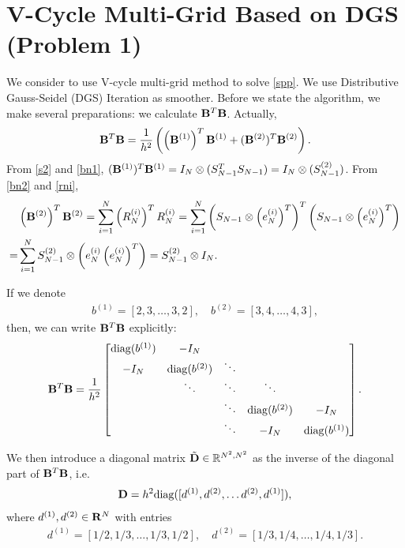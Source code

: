 \documentclass[english]{pkupaper}
\newenvironment{eqt}{\begin{equation}\begin{aligned}}{\end{aligned}\end{equation}}
\begin{document}
\section{V-Cycle Multi-Grid Based on DGS (Problem 1)}
\label{sec:prob1}
We consider to use V-cycle multi-grid method to solve \ref{spp}. We use Distributive Gauss-Seidel (DGS) Iteration as smoother. Before we state the algorithm, we make several preparations: we calculate $\mathbf{B}^T\mathbf{B}$. Actually,
\begin{eqt}
\mfB^T\mfB=\frac{1}{h^2}\left(\left(\mfB^{(1)}\right)^T\mfB^{(1)}+(\mfB^{(2)})^T\mfB^{(2)}\right).
\end{eqt}
From \ref{s2} and \ref{bn1}, $(\mathbf{B}^{(1)})^T\mathbf{B}^{(1)}=I_N\otimes (S_{N-1}^TS_{N-1})=I_N\otimes (S_{N-1}^{(2)})$. From \ref{bn2} and \ref{rni}, 
\begin{eqt}
&\left(\mfB^{(2)}\right)^T\mfB^{(2)}=\sum_{i=1}^N\left(R_N^{(i)}\right)^TR_N^{(i)}=\sum_{i=1}^N\left(S_{N-1}\otimes \left(e_N^{(i)}\right)^T\right)^T\left(S_{N-1}\otimes \left(e_N^{(i)}\right)^T\right)\\
=&\sum_{i=1}^NS_{N-1}^{(2)}\otimes\left(e_N^{(i)}\left(e_N^{(i)}\right)^T\right)=S_{N-1}^{(2)}\otimes I_N.
\end{eqt}

If we denote
\begin{eqt}
b^{(1)}=[2,3,\dots, 3,2],\quad b^{(2)}=[3,4,\dots, 4,3],
\end{eqt}
then, we can write $\mathbf{B}^T\mathbf{B}$ explicitly:
\begin{eqt}
\mfB^T\mfB=\frac{1}{h^2}\begin{bmatrix}
\mathrm{diag}(b^{(1)})&-I_N\\
-I_N&\mathrm{diag}(b^{(2)})&\ddots\\
&\ddots&\ddots&\ddots\\
&&\ddots&\mathrm{diag}(b^{(2)})&-I_N\\
&&\ddots&-I_N&\mathrm{diag}(b^{(1)})\\
\end{bmatrix}.
\end{eqt}

We then introduce a diagonal matrix $\tilde {\mathbf{D}}\in \mathbb{R}^{N^2, N^2}$ as the inverse of the diagonal part of $\mathbf{B}^T\mathbf{B}$, i.e.
\begin{eqt}
\label{mfD}
\mfD=h^2\mathrm{diag}([d^{(1)}, d^{(2)}, \dots d^{(2)}, d^{(1)}]),
\end{eqt}
where $d^{(1)}, d^{(2)}\in\mathbf{R}^N$ with entries 
\begin{eqt}
d^{(1)}=[1/2,1/3,\dots, 1/3,1/2],\quad d^{(2)}=[1/3,1/4,\dots, 1/4,1/3].
\end{eqt}
\end{document}
